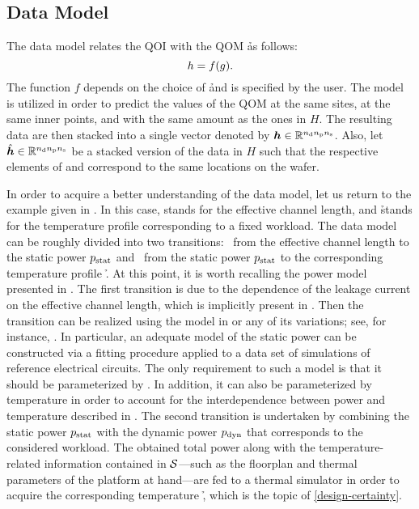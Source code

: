 \subsection{Data Model}

The data model relates the \ac{QOI} \g with the \ac{QOM} \h as follows:
\[
  h = f(g).
\]
The function $f$ depends on the choice of \h and is specified by the user. The
model is utilized in order to predict the values of the \ac{QOM} at the same
sites, at the same inner points, and with the same amount as the ones in $H$.
The resulting data are then stacked into a single vector denoted by $\boldsymbol{h} \in
\mathbb{R}^{{n_\mathrm{d}} {n_\mathrm{p}} {n_\mathrm{s}}}$. Also, let $\hat{\boldsymbol{h}} \in \mathbb{R}^{{n_\mathrm{d}} {n_\mathrm{p}} {n_\mathrm{s}}}$ be a stacked
version of the data in $H$ such that the respective elements of \vh and \hvh
correspond to the same locations on the wafer.

In order to acquire a better understanding of the data model, let us return to
the example given in . In this case, \g stands for the
effective channel length, and \h stands for the temperature profile
corresponding to a fixed workload. The data model can be roughly divided into
two transitions: \one~from the effective channel length \g to the static power
$p_{\mathrm{stat}}$ and \two~from the static power $p_{\mathrm{stat}}$ to the corresponding
temperature profile \h. At this point, it is worth recalling the power model
presented in . The first transition is due to the dependence
of the leakage current on the effective channel length, which is implicitly
present in . Then the transition can be realized using the
model in  or any of its variations; see, for instance,
\cite{chandrakasan2000, srivastava2010, juan2012}. In particular, an adequate
model of the static power can be constructed via a fitting procedure applied to
a data set of  simulations of reference electrical circuits. The only
requirement to such a model is that it should be parameterized by \g. In
addition, it can also be parameterized by temperature in order to account for
the interdependence between power and temperature described in
. The second transition is undertaken by combining the
static power $p_{\mathrm{stat}}$ with the dynamic power $p_{\mathrm{dyn}}$ that corresponds
to the considered workload. The obtained total power along with the
temperature-related information contained in $\mathcal{S}$---such as the floorplan and
thermal parameters of the platform at hand---are fed to a thermal simulator in
order to acquire the corresponding temperature \h, which is the topic of
\cref{design-certainty}.


